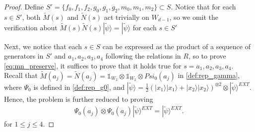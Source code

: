 \documentclass[11pt,letterpaper]{article}
\newcommand{\ket}[1]{|#1\rangle}
\newcommand{\x}{\otimes}
\newcommand{\1}{\mathbb{1}}
\newcommand{\EXT}{EXT}
\newcommand{\tM}{\tilde{M}}
\newcommand{\tN}{\tilde{N}}
\newcommand{\tpsi}{\tilde{\psi}}
\theoremstyle{definition}
\begin{document}
\begin{proof}
    Define $S' = \{f_0, f_1, f_2, g_0, g_1, g_2, m_0, m_1, m_2\} \subset S$. Notice that for each $s \in S'$, both $\tM(s)$ and $\tN(s)$ act
    trivially on $W_{d-1}$, so we omit the verification about 
    $\tM(s)\tN(s) \ket{\tpsi} = \ket{\tpsi}$ for each $s \in S'$
	
	Next, we notice that each $s \in S$ can be expressed as the 
	product of a sequence of generators in $S'$ and $a_1, a_2, a_3, a_4$
	following the relations in $R$, so
	to prove \cref{eq:mn_preserve}, it suffices to prove that it 
	holds true for $s = a_1, a_2, a_3, a_4$. 
	Recall that $\tM(a_j) = \tN(a_j) = \1_{W_2} \x \1_{W_2} \x Psi_0(a_j)$
	in \cref{def:rep_gamma},
	where $\Psi_0$ is defined in \cref{def:rep_g0},
	and $\ket{\tpsi} = \frac{1}{2} (\ket{x_1}\ket{x_1}+\ket{x_2}\ket{x_2})^{\x 2} \x \ket{\tpsi}^{\EXT}$.
	Hence, the problem is further reduced to proving
	\begin{align*}
	    \Psi_0(a_j) \x \Psi_0(a_j) \ket{\tpsi}^{\EXT} = \ket{\tpsi}^{\EXT}.
	\end{align*}
	for $1 \leq j \leq 4$.
	

\end{proof}
\end{document}
